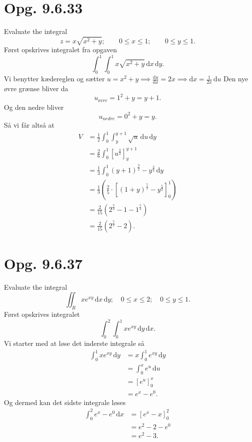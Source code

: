 \documentclass[12pt]{article}
\theoremstyle{definition}
\begin{document}
\section*{Opg. 9.6.33}
Evaluate the integral
\[ 
z = x \sqrt{x^2 + y}; \qquad 0 \leq x \leq 1; \qquad 0 \leq y \leq 1
.\]
\bigbreak
Først opskrives integralet fra opgaven
\[ 
\int_{0}^{1} \int_{0}^{1} x \sqrt{x^2 + y} \, \mathrm{d}x \, \mathrm{d}y 
.\]
Vi benytter kædereglen og sætter $u = x^2 + y \implies \frac{\mathrm{d}u}{\mathrm{d}x} = 2x \implies \mathrm{d}x = \frac{1}{2x}\, \mathrm{d}u$ 
Den nye øvre grænse bliver da
\[ 
u_{øvre} = 1^2 + y = y+1
.\]
Og den nedre bliver
\[ 
u_{nedre} = 0^2 + y = y
.\]
Så vi får altså at
\begin{align*}
  V &= \frac{1}{2} \int_{0}^{1} \int_{y}^{y+1} \sqrt{u} \, \mathrm{d}u \, \mathrm{d}y  \\
  &= \frac{2}{6} \int_{0}^{1} \left[ u^{\frac{3}{2}} \right]_{y}^{y+1} \\
  &= \frac{1}{3} \int_{0}^{1} (y+1)^{\frac{3}{2}} - y^{\frac{3}{2}} \, \mathrm{d}y  \\
  &= \frac{1}{3} \left( \frac{2}{5} \cdot \left[ (1+y)^{\frac{5}{2}} - y^{\frac{5}{2}} \right]_{0}^{1} \right) \\
  &= \frac{2}{15} \left( 2^{\frac{5}{2}} - 1 - 1^{\frac{5}{2}} \right) \\
  &= \frac{2}{15}\left( 2^{\frac{5}{2}} - 2 \right)
.\end{align*}


\section*{Opg. 9.6.37}
Evaluate the integral
\[ 
\iint_R xe^{xy} \, \mathrm{d}x \, \mathrm{d}y; \quad 0 \leq x \leq 2; \quad 0 \leq y \leq 1
.\]
\bigbreak
Først opskrives integralet
\[ 
\int_{0}^{2} \int_{0}^{1} xe^{xy} \, \mathrm{d}y \, \mathrm{d}x  
.\]
Vi starter med at løse det inderste integrale så
\begin{align*}
  \int_{0}^{1} xe^{xy} \, \mathrm{d}y &= x \int_{0}^{1} e^{xy} \, \mathrm{d}y  \\
  &= \int_{0}^{x} e^{u} \, \mathrm{d}u \\
  &= \left[ e^{u} \right]_{0}^{x} \\
  &= e^{x} - e^{0}
.\end{align*}
Og dermed kan det sidste integrale løses
\begin{align*}
  \int_{0}^{2} e^{x} - e^{0} \, \mathrm{d}x &= \left[ e^{x} - x \right]_{0}^{2} \\
  &= e^2 - 2 - e^{0} \\
  &=  e^2 - 3
.\end{align*}
\end{document}

